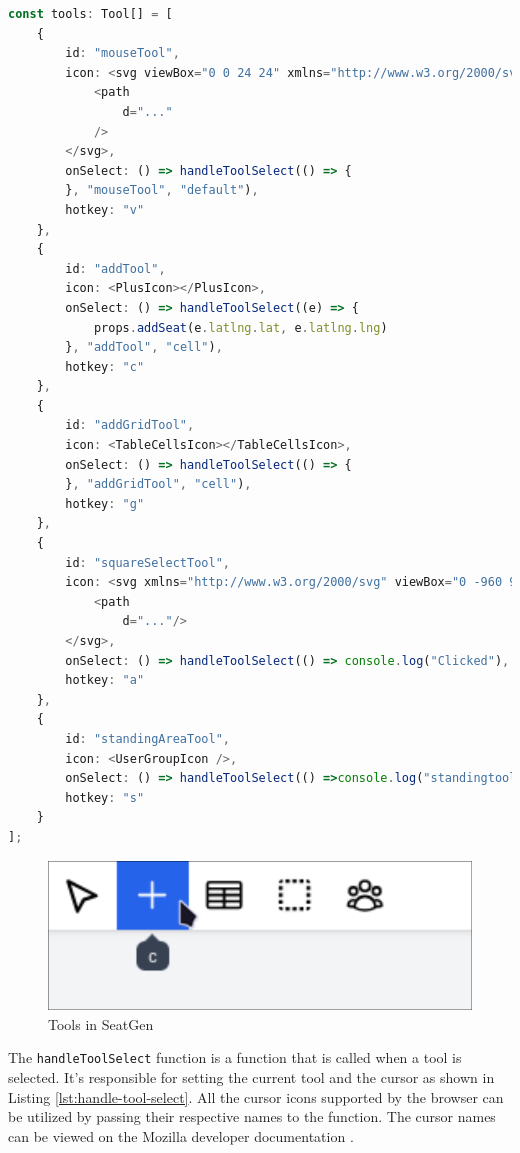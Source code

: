 \begin{lstlisting}[language=TypeScript,caption={Implemented Tools},label={lst:implemented-tools}]
const tools: Tool[] = [
    {
        id: "mouseTool",
        icon: <svg viewBox="0 0 24 24" xmlns="http://www.w3.org/2000/svg">
            <path
                d="..."
            />
        </svg>,
        onSelect: () => handleToolSelect(() => {
        }, "mouseTool", "default"),
        hotkey: "v"
    },
    {
        id: "addTool",
        icon: <PlusIcon></PlusIcon>,
        onSelect: () => handleToolSelect((e) => {
            props.addSeat(e.latlng.lat, e.latlng.lng)
        }, "addTool", "cell"),
        hotkey: "c"
    },
    {
        id: "addGridTool",
        icon: <TableCellsIcon></TableCellsIcon>,
        onSelect: () => handleToolSelect(() => {
        }, "addGridTool", "cell"),
        hotkey: "g"
    },
    {
        id: "squareSelectTool",
        icon: <svg xmlns="http://www.w3.org/2000/svg" viewBox="0 -960 960 960">
            <path
                d="..."/>
        </svg>,
        onSelect: () => handleToolSelect(() => console.log("Clicked"), "squareSelectTool", "crosshair"),
        hotkey: "a"
    },
    {
        id: "standingAreaTool",
        icon: <UserGroupIcon />,
        onSelect: () => handleToolSelect(() =>console.log("standingtool"), "standingAreaTool", "crosshair"),
        hotkey: "s"
    }
];
\end{lstlisting}

\begin{figure}
    \centering
    \includegraphics[scale=0.2]{pics/toolbar.png}
    \caption{Tools in SeatGen}
    \label{fig:tools}
\end{figure}


The \texttt{handleToolSelect} function is a function that is called when a tool is selected. It's responsible for setting the current tool and the cursor as shown in Listing \ref{lst:handle-tool-select}. All the cursor icons supported by the browser can be utilized by passing their respective names to the function. The cursor names can be viewed on the Mozilla developer documentation \cite{MDNCursor}.

